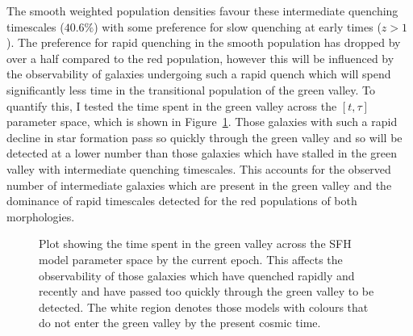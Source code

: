 The smooth weighted population densities favour these intermediate quenching timescales ($40.6\%$) with some preference for slow quenching at  early times ($z > 1$). The preference for rapid quenching in the smooth population has dropped by over a half compared to the red population, however this will be influenced by the observability of galaxies undergoing such a rapid quench which will spend significantly less time in the transitional population of the green valley. To quantify this, I tested the time spent in the green valley across the $[t, \tau]$ parameter space, which is shown in Figure~\ref{fig:timeingv}. Those galaxies with such a rapid decline in star formation pass so quickly through the green valley and so will be detected at a lower number than those galaxies which have stalled in the green valley with intermediate quenching timescales.  This accounts for the observed number of intermediate galaxies which are present in the green valley and the dominance of rapid timescales detected for the red populations of both morphologies.

\begin{figure}
\caption[Time spent in the green valley across parameter space]{Plot showing the time spent in the green valley across the SFH model parameter space by the current epoch. This affects the observability of those galaxies which have quenched rapidly and recently and have passed too quickly through the green valley to be detected. The white region denotes those models with colours that do not enter the green valley by the present cosmic time.}
\label{fig:timeingv}
\end{figure}

